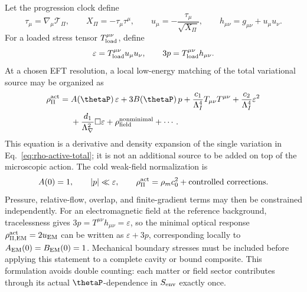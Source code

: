 \documentclass[12pt]{article}
\begin{document}
Let the progression clock define
\begin{equation}
    \tau_\mu=\nabla_\mu\mathcal T_\Pi,
    \qquad
    X_\Pi=-\tau_\mu\tau^\mu,
    \qquad
    u_\mu=-\frac{\tau_\mu}{\sqrt{X_\Pi}},
    \qquad
    h_{\mu\nu}=g_{\mu\nu}+u_\mu u_\nu .
    \label{eq:progression-clock-frame}
\end{equation}
For a loaded stress tensor \(T_{\rm load}^{\mu\nu}\), define
\begin{equation}
    \varepsilon=T_{\rm load}^{\mu\nu}u_\mu u_\nu,
    \qquad
    3p=T_{\rm load}^{\mu\nu}h_{\mu\nu}.
    \label{eq:environment-energy-pressure}
\end{equation}
At a chosen EFT resolution, a local low-energy matching of the total variational source may be organized as
\begin{equation}
\begin{aligned}
    \rho_\Pi^{\rm act}
    ={}&A(\thetaP)\,\varepsilon
       +3B(\thetaP)\,p
       +\frac{c_1}{\Lambda_I^4}T_{\mu\nu}T^{\mu\nu}
       +\frac{c_2}{\Lambda_I^4}\varepsilon^2 \\
      &+\frac{d_1}{\Lambda_\nabla^2}\Box\varepsilon
       +\rho_{\rm field}^{\rm nonminimal}
       +\cdots .
    \label{eq:source-response-expansion}
\end{aligned}
\end{equation}
This equation is a derivative and density expansion of the single variation in Eq.~\eqref{eq:rho-active-total}; it is not an additional source to be added on top of the microscopic action.  The cold weak-field normalization is
\begin{equation}
    A(0)=1,
    \qquad
    |p|\ll\varepsilon,
    \qquad
    \rho_\Pi^{\rm act}=\rho_m c_0^2+\text{controlled corrections}.
    \label{eq:cold-source-normalization}
\end{equation}
Pressure, relative-flow, overlap, and finite-gradient terms may then be constrained independently.  For an electromagnetic field at the reference background, tracelessness gives \(3p=T^{\mu\nu}h_{\mu\nu}=\varepsilon\), so the minimal optical response \(\rho_{\Pi,{\rm EM}}^{\rm act}=2u_{\rm EM}\) can be written as \(\varepsilon+3p\), corresponding locally to \(A_{\rm EM}(0)=B_{\rm EM}(0)=1\).  Mechanical boundary stresses must be included before applying this statement to a complete cavity or bound composite.  This formulation avoids double counting: each matter or field sector contributes through its actual \(\thetaP\)-dependence in \(S_{\rm env}\) exactly once.
\end{document}
